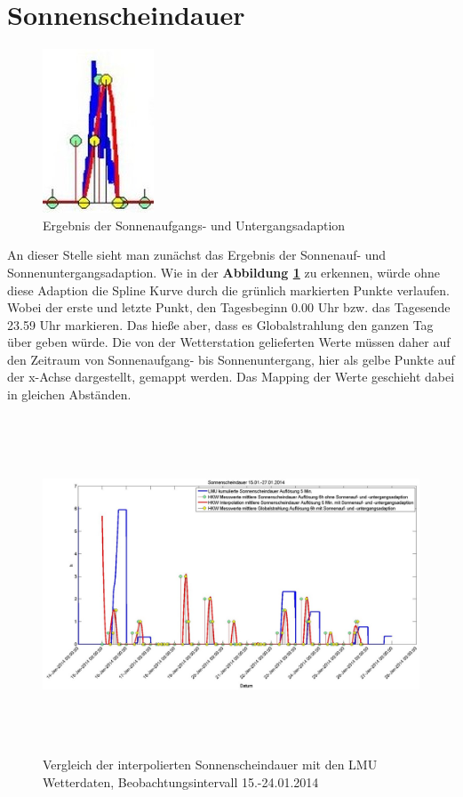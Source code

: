 \section{Sonnenscheindauer}
\begin{figure}
\centering
\includegraphics{analyse/sunriseadaption}
\caption{Ergebnis der Sonnenaufgangs- und Untergangsadaption}
\label{fig:sunriseadapt}
\end{figure}
An dieser Stelle sieht man zunächst das Ergebnis der Sonnenauf- und Sonnenuntergangsadaption. Wie in der \textbf{Abbildung \ref{fig:sunriseadapt}} zu erkennen, würde ohne diese Adaption die Spline Kurve durch die grünlich markierten Punkte verlaufen. Wobei der erste und letzte Punkt, den Tagesbeginn 0.00 Uhr bzw. das Tagesende 23.59 Uhr markieren. Das hieße aber, dass es Globalstrahlung den ganzen Tag über geben würde. Die von der Wetterstation gelieferten Werte müssen daher auf den Zeitraum von Sonnenaufgang- bis Sonnenuntergang, hier als gelbe Punkte auf der x-Achse dargestellt, gemappt werden. Das Mapping der Werte geschieht dabei in gleichen Abständen.
\begin{figure}[htbp]
\centering
\includegraphics[width=16cm,height=10cm]{analyse/sonnensdauer2}
\caption{Vergleich der interpolierten Sonnenscheindauer mit den LMU Wetterdaten, Beobachtungsintervall 15.-24.01.2014}
\label{fig:sonnensdauer}
\end{figure}

